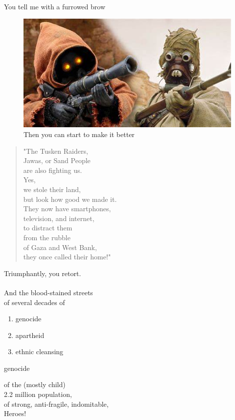 \documentclass[16pt,openany,oneside]{book}
\begin{document}
You tell me with a furrowed brow

\begin{figure}[H]
    \centering
    \includegraphics[width=0.5\linewidth]{assets/star_wars/sand_people.jpg}
    \caption{Then you can start to make it better}
    \label{fig:sand-people}
\end{figure}

\begin{quote}
    "The Tusken Raiders, \\
     Jawas, or Sand People \\ 
    are also fighting us. \\ 
    
    Yes, \\ 
    we stole their land, \\ 
    but look how good we made it. \\ 
    
    They now have smartphones, \\ 
    television, and internet, \\ 
    to distract them \\ 
    from the rubble \\ 
    of Gaza and West Bank, \\
    they once called their home!" \\
\end{quote}

Triumphantly, you retort.
\\\\
And the blood-stained streets \\ 
of several decades of 
\begin{enumerate}
    \item genocide
    \item apartheid
    \item ethnic cleansing
\end{enumerate}genocide 

of the (mostly child) \\
2.2 million population, \\ 
of strong, anti-fragile, indomitable, \\ 
Heroes! 
\end{document}
